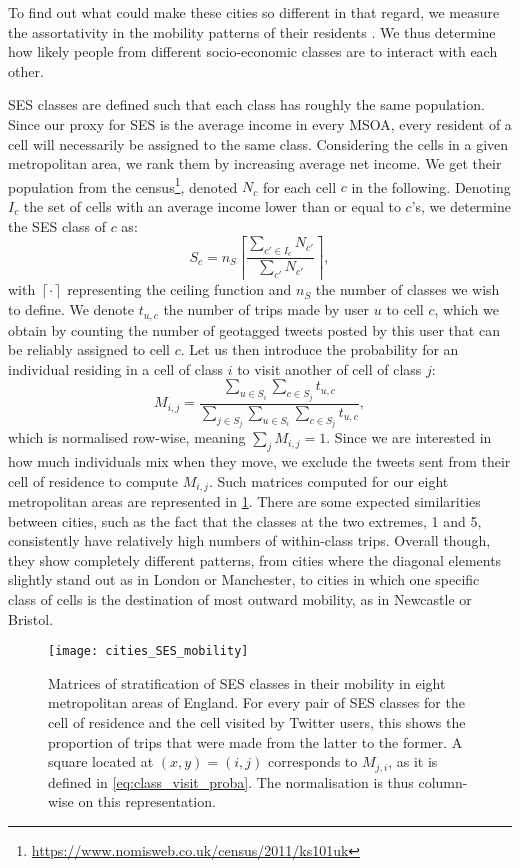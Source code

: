 \documentclass[../thesis.tex]{subfiles}
\begin{document}
To find out what could make these cities so different in that regard, we measure the
assortativity in the mobility patterns of their residents
\cite{HilmanSocioeconomicBiases2022}. We thus determine how likely people from different
socio-economic classes are to interact with each other.

\Ac{SES} classes are defined such that each class has roughly the same population. Since
our proxy for \ac{SES} is the average income in every \ac{MSOA}, every resident of a
cell will necessarily be assigned to the same class. Considering the cells in a given
metropolitan area, we rank them by increasing average net income. We get their
population from the
census\footnote{\url{https://www.nomisweb.co.uk/census/2011/ks101uk}}, denoted $N_c$ for
each cell $c$ in the following. Denoting $I_c$ the set of cells with an average income
lower than or equal to $c$'s, we determine the \ac{SES} class of $c$ as:
\begin{equation}
  S_c = n_S \left\lceil \frac{\sum_{c' \in I_c} N_{c'}}{\sum_{c'} N_{c'}} \right\rceil,
\end{equation}
with $\left\lceil \cdot \right\rceil$ representing the ceiling function and $n_S$ the
number of classes we wish to define. We denote $t_{u, c}$ the number of trips made by
user $u$ to cell $c$, which we obtain by counting the number of geotagged tweets posted
by this user that can be reliably assigned to cell $c$. Let us then introduce the
probability for an individual residing in a cell of class $i$ to visit another of cell
of class $j$:
\begin{equation}
  \label{eq:class_visit_proba}
  M_{i, j} = \frac{
      \sum_{u \in S_i} \sum_{c \in S_j} t_{u, c}
    }{
      \sum_{j \in S_j} \sum_{u \in S_i} \sum_{c \in S_j} t_{u, c}
    },
\end{equation}
which is normalised row-wise, meaning $\sum_j M_{i, j} = 1$. Since we are interested in
how much individuals mix when they move, we exclude the tweets sent from their cell of
residence to compute $M_{i, j}$. Such matrices computed for our eight metropolitan areas
are represented in \cref{fig:cities_SES_mobility}. There are some expected similarities
between cities, such as the fact that the classes at the two extremes, 1 and 5,
consistently have relatively high numbers of within-class trips. Overall though, they
show completely different patterns, from cities where the diagonal elements slightly
stand out as in London or Manchester, to cities in which one specific class of cells is
the destination of most outward mobility, as in Newcastle or Bristol. 
\begin{figure}
\centering
  \texttt{[image: cities\_SES\_mobility]}
  \caption{ Matrices of stratification of \ac{SES} classes in their mobility in eight
  metropolitan areas of England. For every pair of \ac{SES} classes for the cell of
  residence and the cell visited by Twitter users, this shows the proportion of trips
  that were made from the latter to the former. A square located at $(x, y) = (i, j)$
  corresponds to $M_{j, i}$, as it is defined in \cref{eq:class_visit_proba}. The
  normalisation is thus column-wise on this representation.}
  \label{fig:cities_SES_mobility}
\end{figure}
\end{document}
